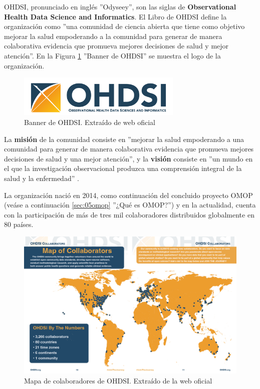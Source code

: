 OHDSI, pronunciado en inglés ''Odyseey'', son las siglas de \textbf{Observational Health Data Science and Informatics}. El Libro de OHDSI \parencite{OHDSIbook} define la organización como ''una comunidad de ciencia abierta que tiene como objetivo mejorar la salud empoderando a la comunidad para generar de manera colaborativa evidencia que promueva mejores decisiones de salud y mejor atención''. En la Figura \ref{fig:OHDSIbanner} ''Banner de OHDSI'' se muestra el logo de la organización.

\begin{figure}[H]
    \centering
    \includegraphics[width=0.70\textwidth]{figures/OHDSIbanner.png}
    \caption{Banner de OHDSI. Extraído de web oficial \parencite{OHDSIwebsite}}
    \label{fig:OHDSIbanner}
\end{figure}

La \textbf{misión} de la comunidad consiste en ''mejorar la salud empoderando a una comunidad para generar de manera colaborativa evidencia que promueva mejores decisiones de salud y una mejor atención'', y la \textbf{visión} consiste en ''un mundo en el que la investigación observacional produzca una comprensión integral de la salud y la enfermedad'' \parencite{OHDSIwebsite}\parencite{OHDSIbook}. 

La organización nació en 2014, como continuación del concluido proyecto OMOP (veáse a continuación \ref{sec:05omop} ''¿Qué es OMOP?'') y en la actualidad, cuenta con la participación de más de tres mil colaboradores distribuidos globalmente en 80 países.

\begin{figure}[H]
    \centering
    \includegraphics[width=1\textwidth]{figures/OHDSIcollaborators.png}
     \caption{Mapa de colaboradores de OHDSI. Extraído de la web oficial \parencite{OHDSIwebsite}}
    \label{fig:OHDSIcollaborators}
\end{figure}

